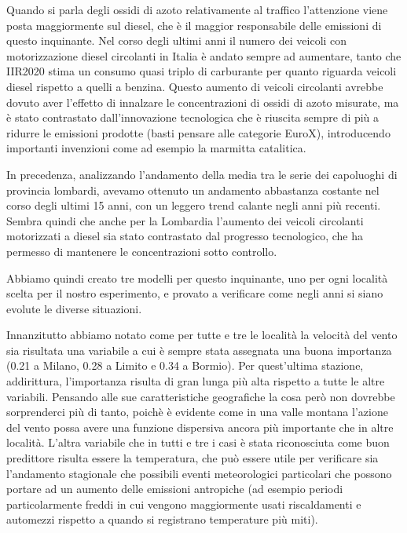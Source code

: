 \documentclass[a4paper]{report}
\begin{document}
Quando si parla degli ossidi di azoto relativamente al traffico l'attenzione viene posta maggiormente sul diesel, che è il maggior responsabile delle emissioni di questo inquinante. Nel corso degli ultimi anni il numero dei veicoli con motorizzazione diesel circolanti in Italia è andato sempre ad aumentare, tanto che IIR2020 \cite{iir2020} stima un consumo quasi triplo di carburante per quanto riguarda veicoli diesel rispetto a quelli a benzina. Questo aumento di veicoli circolanti avrebbe dovuto aver l'effetto di innalzare le concentrazioni di ossidi di azoto misurate, ma è stato contrastato dall'innovazione tecnologica che è riuscita sempre di più a ridurre le emissioni prodotte (basti pensare alle categorie EuroX), introducendo importanti invenzioni come ad esempio la marmitta catalitica.

In precedenza, analizzando  l'andamento della media tra le serie dei capoluoghi di provincia lombardi, avevamo ottenuto un andamento abbastanza costante nel corso degli ultimi 15 anni, con un leggero trend calante negli anni più recenti. Sembra quindi che anche per la Lombardia l'aumento dei veicoli circolanti motorizzati a diesel sia stato contrastato dal progresso tecnologico, che ha permesso di mantenere le concentrazioni sotto controllo.

Abbiamo quindi creato tre modelli per questo inquinante, uno per ogni località scelta per il nostro esperimento, e provato a verificare come negli anni si siano evolute le diverse situazioni.

Innanzitutto abbiamo notato come per tutte e tre le località la velocità del vento sia risultata una variabile a cui è sempre stata assegnata una buona importanza (0.21 a Milano, 0.28 a Limito e 0.34 a Bormio). Per quest'ultima stazione, addirittura, l'importanza risulta di gran lunga più alta rispetto a tutte le altre variabili.  Pensando alle sue caratteristiche geografiche la cosa però non dovrebbe sorprenderci più di tanto, poichè è evidente come in una valle montana l'azione del vento possa avere una funzione dispersiva ancora più importante che in altre località.
L'altra variabile che in tutti e tre i casi è stata riconosciuta come buon predittore risulta essere la temperatura, che può essere utile per verificare sia l'andamento stagionale che possibili eventi meteorologici particolari che possono portare ad un aumento delle emissioni antropiche (ad esempio periodi particolarmente freddi in cui vengono maggiormente usati riscaldamenti e automezzi rispetto a quando si registrano temperature più miti).  
\end{document}
